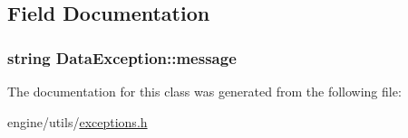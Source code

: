 \subsection{Field Documentation}
\hypertarget{classDataException_a8cac3128f4a8d7749d2ffcefa0726aee}{
\subsubsection[{message}]{\setlength{\rightskip}{0pt plus 5cm}string {\bf DataException::message}}}
\label{classDataException_a8cac3128f4a8d7749d2ffcefa0726aee}


The documentation for this class was generated from the following file:\begin{DoxyCompactItemize}
\item 
engine/utils/\hyperlink{exceptions_8h}{exceptions.h}\end{DoxyCompactItemize}
